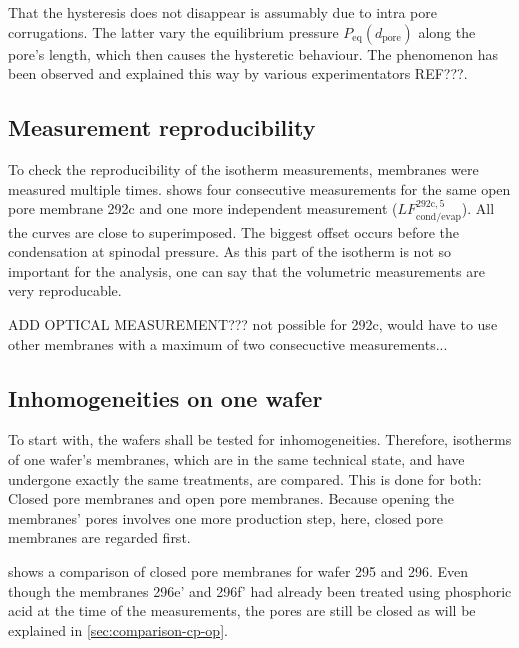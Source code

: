\documentclass[../thesis.tex]{subfiles}
\begin{document}
        That the hysteresis does not disappear is assumably due to intra pore corrugations. The latter vary the equilibrium pressure $P_\mathrm{eq}(d_\mathrm{pore})$ along the pore's length, which then causes the hysteretic behaviour. The phenomenon has been observed and explained this way by various experimentators REF???.

        


    \subsection{Measurement reproducibility}
    \label{subsec:measurement-reproducibility}

        To check the reproducibility of the isotherm measurements, membranes were measured multiple times.  shows four consecutive measurements for the same open pore membrane 292c and one more independent measurement ($LF_\mathrm{cond/evap}^\mathrm{292c,5}$). All the curves are close to superimposed. The biggest offset occurs before the condensation at spinodal pressure. As this part of the isotherm is not so important for the analysis, one can say that the volumetric measurements are very reproducable.

        

        ADD OPTICAL MEASUREMENT??? not possible for 292c, would have to use other membranes with a maximum of two consecuctive measurements...


    \subsection{Inhomogeneities on one wafer}
    \label{subsec:wafer-inhomogeneities}

        

        To start with, the wafers shall be tested for inhomogeneities. Therefore, isotherms of one wafer's membranes, which are in the same technical state, and have undergone exactly the same treatments, are compared. This is done for both: Closed pore membranes and open pore membranes. Because opening the membranes' pores involves one more production step, here, closed pore membranes are regarded first.

         shows a comparison of closed pore membranes for wafer 295 and 296. Even though the membranes 296e' and 296f' had already been treated using phosphoric acid at the time of the measurements, the pores are still be closed as will be explained in \cref{sec:comparison-cp-op}.
\end{document}
